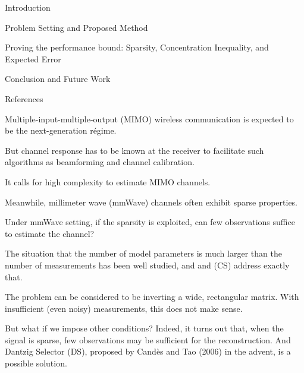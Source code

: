 

\Title {\TitleText}
\blank [big]

\Subtitle {\AuthorText}
\blank [big]

\Subsubtitle {\DateText}

\page [yes]
{
\I Introduction

\I Problem Setting and Proposed Method

\I Proving the performance bound: Sparsity, Concentration Inequality, and Expected Error

\I Conclusion and Future Work

\I References
}
{
\I Multiple-input-multiple-output (MIMO) wireless communication is expected to be the next-generation r\'egime.

\I But channel response has to be known at the receiver to facilitate such algorithms as beamforming and channel calibration.

\I It calls for high complexity to estimate MIMO channels.

\I Meanwhile, millimeter wave (mmWave) channels often exhibit sparse properties.

\I Under mmWave setting, if the sparsity is exploited, can few observations suffice to estimate the channel?
}
{
\I The situation that the number of model parameters is much larger than the number of measurements has been well studied, and and  (CS) address exactly that.

\I The problem can be considered to be inverting a wide, rectangular matrix.
With insufficient (even noisy) measurements, this does not make sense.

\I But what if we impose other conditions?
Indeed, it turns out that, when the signal is sparse, few observations may be sufficient for the reconstruction.
And Dantzig Selector (DS), proposed by Cand\`es and Tao (2006) in the advent, is a possible solution.
}

